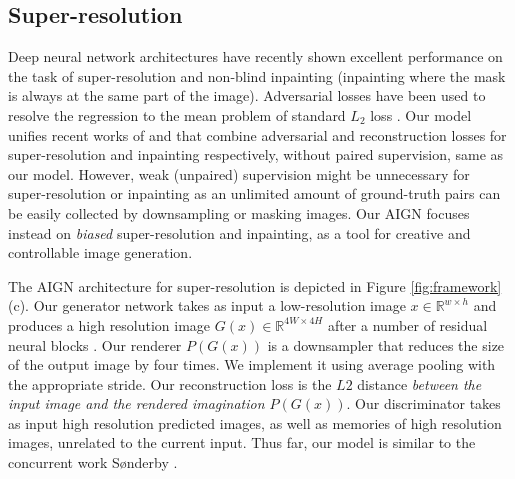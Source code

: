 \documentclass[10pt,twocolumn,letterpaper]{article}
\begin{document}
\begin{bibunit}[ieee]
\subsection{Super-resolution}
Deep neural network architectures have recently shown excellent performance on the task of super-resolution \cite{DBLP:journals/corr/DongLHT15,DBLP:journals/corr/BrunaSL15} and non-blind inpainting \cite{pathakCVPR16context,DBLP:journals/corr/YehCLHD16} (inpainting where the mask is always at the same part of the image). Adversarial losses have been used to resolve the regression to the mean problem of standard $L_2$ loss \cite{DBLP:journals/corr/LedigTHCATTWS16,pathakCVPR16context}. 
Our model unifies recent works of \cite{sonderby2014apparent} and \cite{DBLP:journals/corr/YehCLHD16} that combine adversarial and reconstruction losses for super-resolution and inpainting respectively, without paired supervision, same as our model. 
However, weak (unpaired) supervision might be unnecessary for  super-resolution or inpainting  as an unlimited amount of ground-truth pairs can be easily collected by downsampling or masking images. Our AIGN focuses instead on \textit{biased} super-resolution and  inpainting, as a tool for creative and controllable image generation. 

The AIGN architecture for super-resolution is depicted in Figure \ref{fig:framework} (c). 
Our generator network takes as input a low-resolution image $x \in \mathbb{R}^{w \times h}$ and produces a high resolution image $G(x)\in \mathbb{R}^{4W \times 4H}$ after a number of residual neural blocks \cite{he2016deep}.  Our renderer $P(G(x))$  is a downsampler that reduces the size of the output image by four times. We implement it using average pooling with the appropriate stride. Our reconstruction loss is the $L2$ distance \textit{between the input image and the rendered imagination $P(G(x))$}. 
Our discriminator  takes as input high resolution predicted images, as well as memories of high resolution images, unrelated to the current input.  Thus far, our model is similar to the concurrent work S{\o}nderby \etal\cite{sonderby2014apparent}.  


\end{bibunit}
\end{document}
